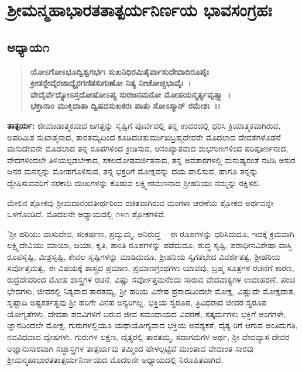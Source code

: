 

\begin{center}
\end{center}

\begin{center}
\end{center}

\chapter{ ಶ‍್ರೀಮನ್ಮಹಾಭಾರತತಾತ್ಪರ್ಯನಿರ್ಣಯ ಭಾವಸಂಗ್ರಹಃ}

\section*{ಅಧ್ಯಾಯ\enginline{-}೧}

\begin{verse}
\textbf{ಯೋಽಗೋಽಭೂದ್ವಿಶ್ವಗರ್ಭಃ ಸುಖನಿಧಿರಮಿತೈರ್ವಾಸುದೇವಾದಿರೂಪೈಃ }\\\textbf{ಕ್ರೀಡನ್ದೇವೈರಜಾದ್ಯೈರಗಣಿತಸುಗುಣೋ ನಿತ್ಯ ನೀಚೋಚ್ಚಭಾವೈಃ~।} \\\textbf{ವೇದೈರ್ವೆದ್ಯೋಽಸ್ತದೋಷೋಽಪ್ಯ ಸುರಜನಮನೋ ಮೋಹಯನ್ಮರ್ತ್ಯವೃತ್ತ್ಯಾ~।} \\\textbf{ಭಕ್ತಾನಾಂ ಮುಕ್ತಿದಾತಾ ದ್ವಿಷದಸುಖಕರಃ ಪಾತು ಸೋಽಸ್ಮಾನ್ ರಮೇಶಃ~।।}
\end{verse}

\textbf{ತಾತ್ಪರ್ಯ:\enginline{-} }ಜೀವಜಡಾತ್ಮಕವಾದ ಜಗತ್ತನ್ನು ಸೃಷ್ಟಿಗೆ ಪೂರ್ವದಲ್ಲಿ ತನ್ನ ಉದರದಲ್ಲಿ ಧರಿಸಿ ಕ್ರಿಯಾತ್ಮಕವಾಗಿರುವ, ಅಪರಿಮಿತ ಸುಖಾತ್ಮನಾದ, ತಾರತಮ್ಯದಿಂದ ಕೂಡಿದ\break ಚತುರ್ಮುಖಬ್ರಹ್ಮದೇವರೇ ಮೊದಲಾದ ದೇವತೆಗಳೊಡನೆ ವಾಸುದೇವನೇ ಮೊದಲಾದ ತನ್ನ ರೂಪಗಳಿಂದ ಕ್ರೀಡಿಸುವ, ಅಸಂಖ್ಯಾತವಾದ ಶುಭಗುಣಗಳಿಂದ ಪರಿಪೂರ್ಣನಾದ, ವೇದಗಳಿಂದಲೇ ತಿಳಿಯಲ್ಪಡಬೇಕಾದ, ಸಕಲದೋಷವರ್ಜಿತನಾದ, ತನ್ನ ಅವತಾರಗಳಲ್ಲಿ ಮನುಷ್ಯರಂತೆ ನಟಿಸಿ ಅಸುರ ಜನರ ಮನಸ್ಸನ್ನು ಮೋಹಗೊಳಿಸುವ, ತನ್ನ ಭಕ್ತರಿಗೆ ಮೋಕ್ಷವನ್ನು ದಯ ಪಾಲಿಸುವ, ಹಾಗೂ ತನ್ನನ್ನು ದ್ವೇಷಿಸುವವರಿಗೆ ನರಕಾದಿ ದುಃಖಗಳನ್ನು ಕೊಡುವ ಲಕ್ಷ್ಮೀರಮಣನಾದ ಶ‍್ರೀಹರಿಯು ನಮ್ಮನ್ನು ರಕ್ಷಿಸಲಿ.

ಮೇಲಿನ ಶ್ಲೋಕವು ಶ‍್ರೀಮದಾನಂದತೀರ್ಥರಿಂದ ರಚಿತವಾಗಿರುವ ಮಂಗಳಾ ಚರಣೆಯ ಶ್ಲೋಕದ ಅರ್ಥವನ್ನೇ ಒಳಗೊಂಡಿದೆ. ಮೊದಲನೇ ಅಧ್ಯಾಯದಲ್ಲಿ ೧೪೧ ಶ್ಲೋಕಗಳಿವೆ.

'ಶ‍್ರೀ ಹರಿಯು ವಾಸುದೇವ, ಸಂಕರ್ಷಣ, ಪ್ರದ್ಯುಮ್ಮ, ಅನಿರುದ್ಧ – ಈ ರೂಪಗಳನ್ನು ಧರಿಸಿದುದೂ, ಇದಕ್ಕೆ ಕ್ರಮವಾಗಿ ಲಕ್ಷ್ಮಿದೇವಿಯು ಮಾಯಾ, ಜಯಾ, ಕೃತಿ, ಶಾಂತಿ ರೂಪಗಳನ್ನು ಪಡೆದುದೂ, ಶುದ್ಧ ಸೃಷ್ಟಿ, ಪರಾಧೀನವಿಶೇಷಾ ವಾಸ್ತಿ ರೂಪಸೃಷ್ಟಿ, ಮಿಶ್ರಸೃಷ್ಟಿ, ಕೇವಲ ಸೃಷ್ಟಿಗಳನ್ನು ಮಾಡಿದುದೂ, ಶ‍್ರೀಹರಿಯ ಸ್ವಗತಭೇದ ವಿವರ್ಜಿತತ್ವ, ಶ‍್ರೀಹರಿಯ ಸರ್ವೊತ್ತಮತ್ವ, ಈ ವಿಷಯಕ್ಕೆ ಶಾಸ್ತ್ರದ ಪ್ರಮಾಣ, ಪ್ರಮಾಣಗ್ರಂಥಗಳು ಯಾವವು, ಬ್ರಹ್ಮ ಸೂತ್ರಗಳ ರಚನೆಗೆ ಕಾರಣ, ರುದ್ರದೇವರಿಂದ ಮೋಹ ಶಾಸ್ತ್ರಗಳ ರಚನೆ, ವಿಷ್ಣು ಸರ್ವೋತ್ತಮನೆಂದು ಸಾರುವ ವೇದವಾಕ್ಯಗಳ ಉದಾಹರಣೆ, ಪಂಚ ಭೇದಗಳು, ಜೀವರಲ್ಲಿ ನಿತ್ಯವಾದ ತಾರತಮ್ಯ, ಶ‍್ರೀ ಹರಿಯ ವಿಶೇಷ ಪ್ರಸಾದದಿಂದಲೇ ಮೋಕ್ಷ, ವಿಷ್ಣುವೇ ಮೋಕ್ಷದಾತ, ಸೃಷ್ಟಾದಿ ಅಷ್ಟಕರ್ತತ್ವವು ಶ‍್ರೀ ಹರಿಗೇ ವಿನಹ ಅನ್ಯರಿಗಲ್ಲ. ಭಕ್ತಿಯ ಸ್ವರೂಪ, ತ್ರಿವಿಧರಾದ ಜೀವರ ಸ್ವರೂಪ ಯೋಗ್ಯತೆಗಳು, ದೇವತಾ ಪದವಿಗಳಿಗೆ ಬರುವ ಜೀವ ಸಮುದಾಯದ ವಿವರಣೆ, ಸತ್ಕರ್ಮಗಳು ಭಕ್ತಿಗೆ ಅಂಗಗಳೇ, ಜ್ಞಾನದಿಂದಲೇ ಮೋಕ್ಷ, ಗುರುಗಳಲ್ಲಿಯೂ ಯಥಾಯೋಗ್ಯವಾದ ಭಕ್ತಿಯ ಅವಶ್ಯಕತೆ, ದೈತ್ಯ ರಿಗೆ ಆಗುವ ಅಂತಿಮಗತಿ, ನವವಿಧವಾದ ದ್ವೇಷಗಳು, ಗುರುಗಳ ಲಕ್ಷಣ, ದೈತ್ಯರಲ್ಲಿ ತಾರತಮ್ಮ, ಸದಾಗಮಗಳ ಅರ್ಥ, ಶ‍್ರೀ ವೇದವ್ಯಾಸ ದೇವರ ಆಜ್ಞಾನುಸಾರವಾಗಿ ಸಚ್ಛಾಸ್ತ್ರಗಳ ತಾತ್ಪರ್ಯವು ತಮ್ಮಿಂದ ಹೇಳಲ್ಪಟ್ಟಿವೆ ಮುಂತಾದ ವೇದಾಂತ ಸಾರವು ಶ‍್ರೀಮನ್ಮಹಾಭಾರತತಾತ್ಪರ್ಯನಿರ್ಣಯದ ಮೊದಲನೇ ಅಧ್ಯಾಯದಲ್ಲಿ ನಿರೂಪಿತ\-ವಾಗಿದೆ.


